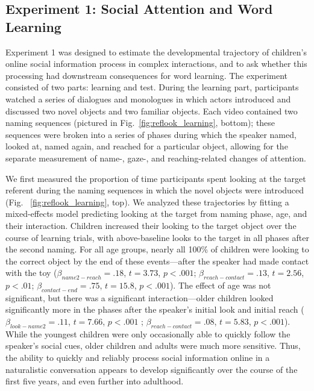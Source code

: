 \documentclass{pnastwo}
\begin{document}
\begin{article}
\section{Experiment 1: Social Attention and Word Learning}

Experiment 1 was designed to estimate the developmental trajectory of children's online social information process in complex interactions, and to ask whether this processing had downstream consequences for word learning. The experiment consisted of two parts: learning and test. During the learning part, participants watched a series of dialogues and monologues in which actors introduced and discussed two novel objects and two familiar objects. Each video contained two naming sequences (pictured in Fig.~\ref{fig:reflook_learning}, bottom); these sequences were broken into a series of phases during which the speaker named, looked at, named again, and reached for a particular object, allowing for the separate measurement of name-, gaze-, and reaching-related changes of attention. 

We first measured the proportion of time participants spent looking at the target referent during the naming sequences in which the novel objects were introduced (Fig. ~\ref{fig:reflook_learning}, top). We analyzed these trajectories by fitting a mixed-effects model predicting looking at the target from naming phase, age, and their interaction. Children increased their looking to the target object over the course of learning trials, with above-baseline looks to the target in all phases after the second naming. For all age groups, nearly all 100\% of children were looking to the correct object by the end of these events---after the speaker had made contact with the toy ($\beta_{name2-reach} = .18$, $t = 3.73$, $p < .001$; $\beta_{reach-contact} = .13$, $t = 2.56$, $p < .01$; $\beta_{contact-end} = .75$, $t = 15.8$, $p < .001$). The effect of age was not significant, but there was a significant interaction---older children looked significantly more in the phases after the speaker's initial look and initial reach ($\beta_{look-name2} = .11$, $t = 7.66$, $p < .001$ ; $\beta_{reach-contact} = .08$, $t = 5.83$, $p < .001$). While the youngest children were only occasionally able to quickly follow the speaker's social cues, older children and adults were much more sensitive. Thus, the ability to quickly and reliably process social information online in a naturalistic conversation appears to develop significantly over the course of the first five years, and even further into adulthood.


\end{article}
\end{document}
